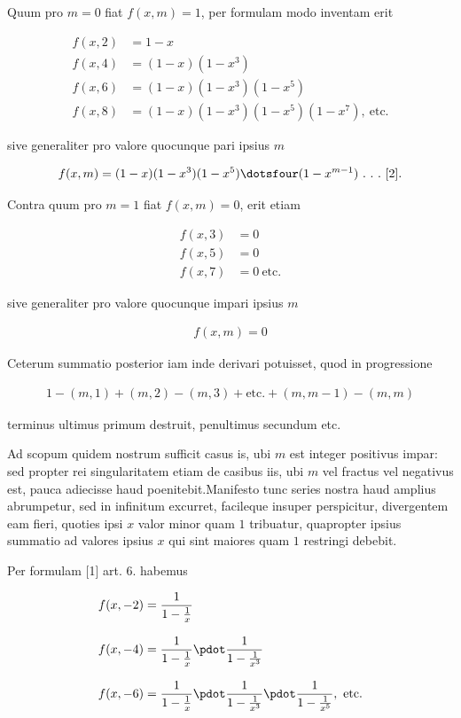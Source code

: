 
Quum pro $m=0$ fiat $f(x,m)=1$, per formulam modo inventam erit

\[
\begin{aligned}
f(x,2)&=1-x\\
f(x,4)&=(1-x)(1-x^3)\\
f(x,6)&=(1-x)(1-x^3)(1-x^5)\\
f(x,8)&=(1-x)(1-x^3)(1-x^5)(1-x^7),\ \text{etc.}
\end{aligned}
\]

sive generaliter pro valore quocunque pari ipsius $m$

\[
\begin{aligned}
f(x,m)=(1-x)(1-x^3)(1-x^5)\dotsfour(1-x^{m-1})\ .\ .\ .\ [2].
\end{aligned}
\]

Contra quum pro $m=1$ fiat $f(x,m)=0$, erit etiam

\[
\begin{aligned}
f(x,3)&=0\\
f(x,5)&=0\\
f(x,7)&=0\ \text{etc.}
\end{aligned}
\]

sive generaliter pro valore quocunque impari ipsius $m$

\[
\begin{aligned}
f(x,m)=0
\end{aligned}
\]

Ceterum summatio posterior iam inde derivari potuisset, quod in progressione

\[
\begin{aligned}
1-(m,1)+(m,2)-(m,3)+\text{etc.}+(m,m-1)-(m,m)
\end{aligned}
\]

terminus ultimus primum destruit, penultimus secundum etc.


Ad scopum quidem nostrum sufficit casus is, ubi $m$ est integer positivus impar: sed propter rei singularitatem etiam de casibus iis, ubi $m$ vel fractus vel negativus est, pauca adiecisse haud poenitebit.\quad Manifesto tunc series nostra haud amplius abrumpetur, sed in infinitum excurret, facileque insuper perspicitur, divergentem eam fieri, quoties ipsi $x$ valor minor quam $1$ tribuatur, quapropter ipsius summatio ad valores ipsius $x$ qui sint maiores quam $1$ restringi debebit.

Per formulam [1] art. 6. habemus

\[
\begin{aligned}
f(x,-2)&=\frac{1}{1-\frac1x}\\[8pt]
f(x,-4)&=\frac{1}{1-\frac1x}\pdot\frac{1}{1-\frac1{x^3}}\\[8pt]
f(x,-6)&=\frac{1}{1-\frac1x}\pdot\frac{1}{1-\frac1{x^3}}\pdot\frac{1}{1-\frac1{x^5}},\ \text{etc.}
\end{aligned}
\]

